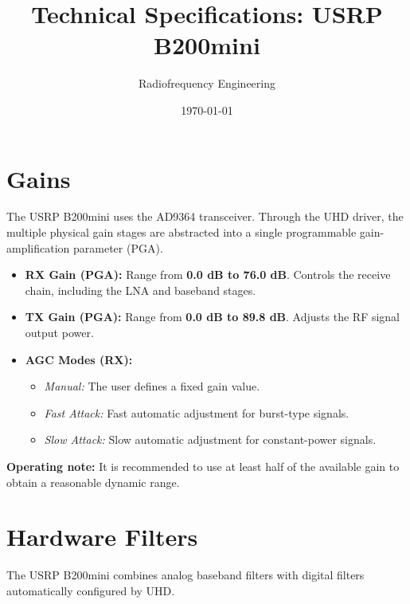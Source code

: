\documentclass[11pt]{article}
\title{Technical Specifications: USRP B200mini}
\author{Radiofrequency Engineering}
\date{\today}
\begin{document}
\maketitle
\tableofcontents
\newpage

\section{Gains}
The USRP B200mini uses the AD9364 transceiver. Through the UHD driver, the multiple physical gain stages are abstracted into a single programmable gain-amplification parameter (PGA).

\begin{itemize}
    \item \textbf{RX Gain (PGA):} Range from \textbf{0.0 dB to 76.0 dB}. Controls the receive chain, including the LNA and baseband stages.
    \item \textbf{TX Gain (PGA):} Range from \textbf{0.0 dB to 89.8 dB}. Adjusts the RF signal output power.
    \item \textbf{AGC Modes (RX):}
    \begin{itemize}
        \item \textit{Manual:} The user defines a fixed gain value.
        \item \textit{Fast Attack:} Fast automatic adjustment for burst-type signals.
        \item \textit{Slow Attack:} Slow automatic adjustment for constant-power signals.
    \end{itemize}
\end{itemize}

\textbf{Operating note:} It is recommended to use at least half of the available gain to obtain a reasonable dynamic range.

\section{Hardware Filters}
The USRP B200mini combines analog baseband filters with digital filters automatically configured by UHD.
\end{document}
